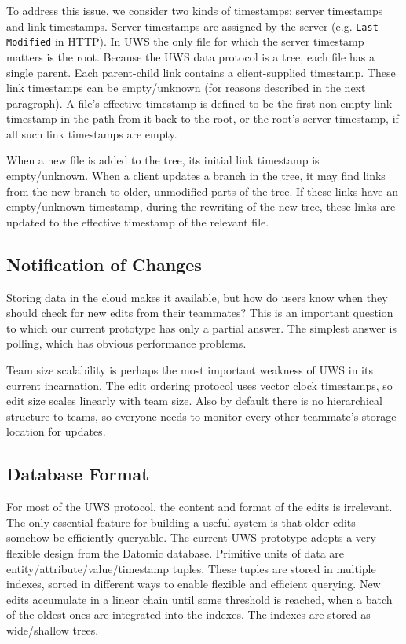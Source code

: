\documentclass{article}
\begin{document}
To address this issue, we consider two kinds of timestamps: server timestamps and link timestamps.
Server timestamps are assigned by the server (e.g. \texttt{Last-Modified} in HTTP).
In UWS the only file for which the server timestamp matters is the root.
Because the UWS data protocol is a tree, each file has a single parent.
Each parent-child link contains a client-supplied timestamp.
These link timestamps can be empty{\slash}unknown (for reasons described in the next paragraph).
A file's effective timestamp is defined to be the first non-empty link timestamp in the path from it back to the root, or the root's server timestamp, if all such link timestamps are empty.

When a new file is added to the tree, its initial link timestamp is empty{\slash}unknown.
When a client updates a branch in the tree, it may find links from the new branch to older, unmodified parts of the tree.
If these links have an empty{\slash}unknown timestamp, during the rewriting of the new tree, these links are updated to the effective timestamp of the relevant file.

\subsection{Notification of Changes}

Storing data in the cloud makes it available, but how do users know when they should check for new edits from their teammates?
This is an important question to which our current prototype has only a partial answer.
The simplest answer is polling, which has obvious performance problems.

Team size scalability is perhaps the most important weakness of UWS in its current incarnation.
The edit ordering protocol uses vector clock timestamps, so edit size scales linearly with team size.
Also by default there is no hierarchical structure to teams, so everyone needs to monitor every other teammate's storage location for updates.



\subsection{Database Format}

For most of the UWS protocol, the content and format of the edits is irrelevant.
The only essential feature for building a useful system is that older edits somehow be efficiently queryable.
The current UWS prototype adopts a very flexible design from the Datomic database.
Primitive units of data are entity{\slash}attribute{\slash}value{\slash}timestamp tuples.
These tuples are stored in multiple indexes, sorted in different ways to enable flexible and efficient querying.
New edits accumulate in a linear chain until some threshold is reached, when a batch of the oldest ones are integrated into the indexes.
The indexes are stored as wide{\slash}shallow trees.
\end{document}

